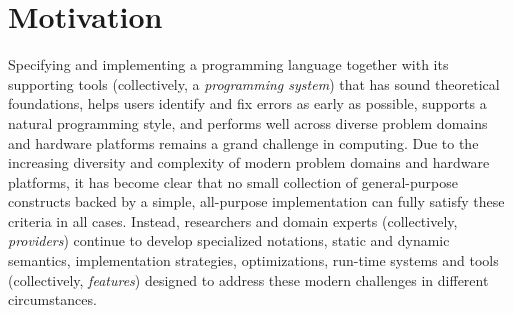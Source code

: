 \vspace{-25pt}
\section{Motivation}\label{motivation}
Specifying and implementing a programming language together with its supporting tools (collectively, a \emph{programming system}) that has sound theoretical foundations, helps users identify and fix errors as early as possible, supports a natural programming style, and performs well across diverse problem domains and hardware platforms remains a grand challenge in computing. Due to the increasing diversity and complexity of modern problem domains and hardware platforms, it has become clear that no small  collection of general-purpose constructs backed by a simple, all-purpose implementation can fully satisfy these criteria in all cases. Instead,  researchers and domain experts (collectively, \emph{providers}) continue to develop  specialized notations,  static and dynamic semantics, implementation strategies, optimizations, run-time systems and tools (collectively, \emph{features})  designed to address these modern challenges in different circumstances. %


